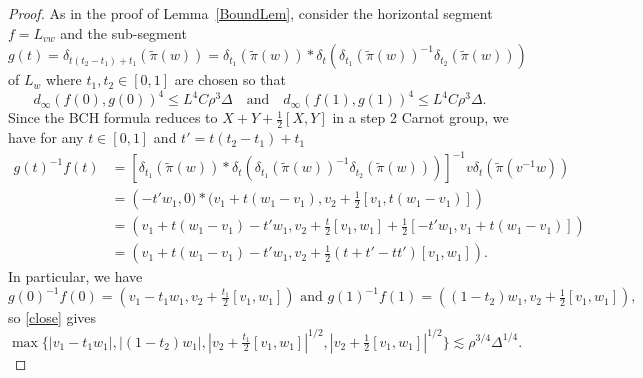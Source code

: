 \documentclass[11pt]{amsart}
\theoremstyle{definition}
\numberwithin{theorem}{section} \numberwithin{equation}{section}
\begin{document}
\begin{proof}
As in the proof of Lemma~\ref{BoundLem}, 
consider the horizontal segment $f = L_{vw}$
and the sub-segment %
$$
g(t) = \delta_{t(t_2-t_1) + t_1}(\tilde{\pi}(w))
=\delta_{t_1}(\tilde{\pi}(w)) * \delta_t( \delta_{t_1}(\tilde{\pi}(w))^{-1} \delta_{t_2}(\tilde{\pi}(w)) )
$$
of $L_w$
where $t_1,t_2 \in [0,1]$ are chosen so that
\begin{equation}
\label{close}
d_{\infty}(f(0),g(0))^4 \leq L^4C\rho^{3} \Delta
\quad
\text{and}
\quad
d_{\infty}(f(1),g(1))^4 \leq L^4C\rho^{3} \Delta.
\end{equation}
Since the BCH formula reduces to $X + Y + \frac12 [X,Y]$ in a step 2 Carnot group, 
we have for any $t \in [0,1]$ and $t' = t(t_2-t_1) + t_1$
\begin{align*}
g(t)^{-1}f(t) 
&=[\delta_{t_1}(\tilde{\pi}(w)) * \delta_t( \delta_{t_1}(\tilde{\pi}(w))^{-1} \delta_{t_2}(\tilde{\pi}(w)) )]^{-1}  v \delta_t(\tilde{\pi}(v^{-1}w)) \\
&=\left(-t'w_1,0)*(v_1 + t(w_1-v_1), v_2 + \tfrac12 [v_1,t(w_1-v_1)] \right) \\
&=\left(v_1 + t(w_1-v_1) - t'w_1, v_2 + \tfrac{t}{2} [v_1,w_1] + \tfrac12 [-t'w_1,v_1 + t(w_1-v_1)]\right) \\
&=\left(v_1 + t(w_1-v_1) - t'w_1, v_2 + \tfrac12(t+t'-tt')[v_1,w_1] \right).
\end{align*}
In particular, we have
$$
g(0)^{-1}f(0) = \left(v_1 - t_1w_1,  v_2 + \tfrac{t_1}{2}[v_1,w_1] \right)
\text{ and }
g(1)^{-1}f(1) = \left((1 - t_2)w_1,  v_2+ \tfrac12[v_1,w_1] \right),
$$
so \eqref{close} gives
$$
\max \{ |v_1 - t_1w_1|, |(1 - t_2)w_1|, |v_2 + \tfrac{t_1}{2}[v_1,w_1]|^{1/2}, |v_2+ \tfrac12[v_1,w_1]|^{1/2} \} \lesssim \rho^{3/4} \Delta^{1/4}.
$$


\end{proof}
\end{document}
